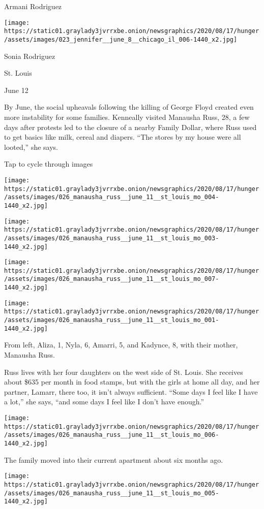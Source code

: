 Armani Rodriguez

\texttt{[image: https://static01.graylady3jvrrxbe.onion/newsgraphics/2020/08/17/hunger/assets/images/023\_jennifer\_\_june\_8\_\_chicago\_il\_006-1440\_x2.jpg]}

Sonia Rodriguez

St. Louis

June 12

By June, the social upheavals following the killing of George Floyd
created even more instability for some families. Kenneally visited
Manausha Russ, 28, a few days after protests led to the closure of a
nearby Family Dollar, where Russ used to get basics like milk, cereal
and diapers. ``The stores by my house were all looted,'' she says.

Tap to cycle through images

\texttt{[image: https://static01.graylady3jvrrxbe.onion/newsgraphics/2020/08/17/hunger/assets/images/026\_manausha\_russ\_\_june\_11\_\_st\_louis\_mo\_004-1440\_x2.jpg]}

\texttt{[image: https://static01.graylady3jvrrxbe.onion/newsgraphics/2020/08/17/hunger/assets/images/026\_manausha\_russ\_\_june\_11\_\_st\_louis\_mo\_003-1440\_x2.jpg]}

\texttt{[image: https://static01.graylady3jvrrxbe.onion/newsgraphics/2020/08/17/hunger/assets/images/026\_manausha\_russ\_\_june\_11\_\_st\_louis\_mo\_007-1440\_x2.jpg]}

\texttt{[image: https://static01.graylady3jvrrxbe.onion/newsgraphics/2020/08/17/hunger/assets/images/026\_manausha\_russ\_\_june\_11\_\_st\_louis\_mo\_001-1440\_x2.jpg]}

From left, Aliza, 1, Nyla, 6, Amarri, 5, and Kadynce, 8, with their
mother, Manausha Russ.

Russ lives with her four daughters on the west side of St. Louis. She
receives about \$635 per month in food stamps, but with the girls at
home all day, and her partner, Lamarr, there too, it isn't always
sufficient. ``Some days I feel like I have a lot,'' she says, ``and some
days I feel like I don't have enough.''

\texttt{[image: https://static01.graylady3jvrrxbe.onion/newsgraphics/2020/08/17/hunger/assets/images/026\_manausha\_russ\_\_june\_11\_\_st\_louis\_mo\_006-1440\_x2.jpg]}

The family moved into their current apartment about six months ago.

\texttt{[image: https://static01.graylady3jvrrxbe.onion/newsgraphics/2020/08/17/hunger/assets/images/026\_manausha\_russ\_\_june\_11\_\_st\_louis\_mo\_005-1440\_x2.jpg]}

